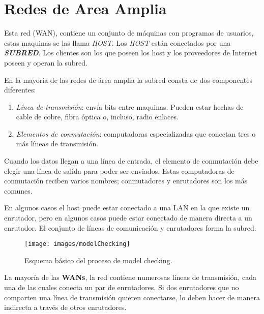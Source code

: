 \documentclass[12pt]{report}
\begin{document}

\section*{Redes de Area Amplia}

Esta red (WAN), contiene un conjunto de m\'aquinas con programas de usuarios, estas maquinas se las llama \textit {HOST}. Los \textit {HOST} est\'an conectados por una \textit {\bf SUBRED}. Los clientes son los que poseen los host y los proveedores de Internet poseen y operan la subred.
  
En la mayor\'ia de las redes de \'area amplia la subred consta de dos componentes diferentes: 
\begin{enumerate}

\item \textit {L\'inea de transmisi\'on}: env\'ia bits entre maquinas. Pueden estar hechas de cable de cobre, fibra \'optica o, incluso, radio enlaces. 

\item \textit {Elementos de conmutaci\'on}: computadoras especializadas que conectan tres o m\'as l\'ineas de transmisi\'on.
\end{enumerate}

Cuando los datos llegan a una l\'inea de entrada, el elemento de conmutaci\'on debe elegir una l\'inea de salida para poder ser enviados. Estas computadoras de conmutaci\'on reciben varios nombres; conmutadores y enrutadores son los m\'as comunes.

En algunos casos el host puede estar conectado a una LAN en la que existe un enrutador, pero en algunos casos puede estar conectado de manera directa a un enrutador.  El conjunto de l\'ineas de comunicaci\'on y enrutadores forma la subred.



\begin{figure}[!h]
\texttt{[image: images/modelChecking]}
\caption{Esquema b\'asico del proceso de model checking.}
\label{modelchecking-IO}
\end{figure}
 
 La mayor\'ia de las {\bf WANs}, la red contiene numerosas l\'ineas de transmisi\'on, cada una de las cuales conecta un par de enrutadores. Si dos enrutadores que no comparten una l\'inea de transmisi\'on quieren conectarse, lo deben hacer de manera indirecta a trav\'es de otros enrutadores.
  
\end{document}

